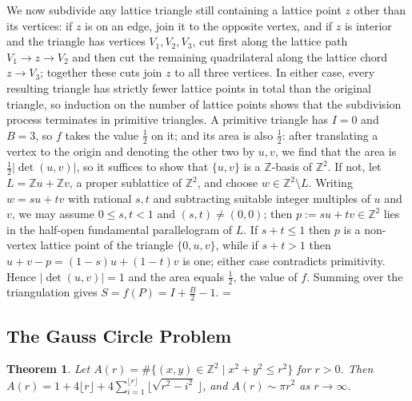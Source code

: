 \documentclass[11pt]{article}
\makeatletter
\theoremstyle{ntstyle}
\newtheorem{theorem}{Theorem}[subsection]
\let\nt@closedisplay\]
\def\nt@guardedclose{\@ifnextchar\par{\nt@closeafterpar}{\@ifnextchar\end{\postdisplaypenalty\@M\nt@closedisplay}{\nt@closedisplay}}}
\def\nt@closeafterpar\par{\@ifnextchar\par{\nt@closeafterpar}{\@ifnextchar\end{\postdisplaypenalty\@M\nt@closedisplay\par}{\nt@closedisplay\par}}}
\renewenvironment{proof}[1][\proofname]{\par
  \pushQED{\qed}\normalfont\topsep\medskipamount\edef\nt@afterproof{\@endparpenalty=\the\@endparpenalty\relax}\@beginparpenalty\@M\@endparpenalty\@M\let\]\nt@guardedclose\trivlist\item[]\textit{#1\@addpunct{.}} \ignorespaces}{\ifvmode\addpenalty\@M\fi\popQED\nt@afterproof\endtrivlist\@endpefalse}
\makeatother
\begin{document}
\begin{proof}
	We now subdivide any lattice triangle still containing a lattice point
	$z$ other than its vertices: if $z$ is on an edge, join it to the opposite
	vertex, and if $z$ is interior and the triangle has vertices
	$V_1,V_2,V_3$, cut first along the lattice path
	$V_1 \to z \to V_2$ and then cut the remaining quadrilateral along the lattice
	chord $z \to V_3$; together these cuts join $z$ to all three vertices. In
	either case, every resulting triangle has strictly fewer lattice
	points in total than the original triangle, so induction on the number of lattice
	points shows that the subdivision process terminates in primitive
	triangles. A primitive triangle has $I = 0$ and $B = 3$, so $f$ takes the value $\tfrac{1}{2}$ on
	it; and its area is also $\tfrac{1}{2}$: after translating a vertex to
	the origin and denoting the other two by $u,v$, we find that the area is
	$\tfrac{1}{2}|\det(u,v)|$, so it suffices to show that $\{u,v\}$ is a
	$\mathbb{Z}$-basis of $\mathbb{Z}^2$. If not, let
	$L=\mathbb{Z}u+\mathbb{Z}v$, a proper sublattice of $\mathbb{Z}^2$, and
	choose $w\in\mathbb{Z}^2\setminus L$. Writing $w=su+tv$ with rational
	$s,t$ and subtracting suitable integer multiples of $u$ and $v$, we
	may assume $0\le s,t<1$ and $(s,t)\neq(0,0)$; then
	$p:=su+tv\in\mathbb{Z}^2$ lies in the half-open fundamental
	parallelogram of $L$. If $s+t\le1$ then $p$ is a non-vertex lattice
	point of the triangle $\{0,u,v\}$, while if $s+t>1$ then
	$u+v-p=(1-s)u+(1-t)v$ is one; either case contradicts
	primitivity. Hence $|\det(u,v)|=1$ and the area equals $\tfrac{1}{2}$, the value of $f$.
	Summing over the triangulation gives $S = f(P) = I + \tfrac{B}{2} -
		1$.
\end{proof}
\subsection{The Gauss Circle Problem}

\begin{theorem}\label{thm:10.9.1} Let $A(r) =
		\#\{(x,y)\in\mathbb{Z}^2 \mid x^2 + y^2 \le r^2\}$ for $r>0$. Then $A(r)
		= 1 + 4\lfloor r\rfloor + 4\sum_{i=1}^{\lfloor r\rfloor}\big\lfloor
		\sqrt{r^2 - i^2}\,\big\rfloor$, and $A(r) \sim \pi r^2$ as $r\to\infty$.
\end{theorem}
\end{document}
